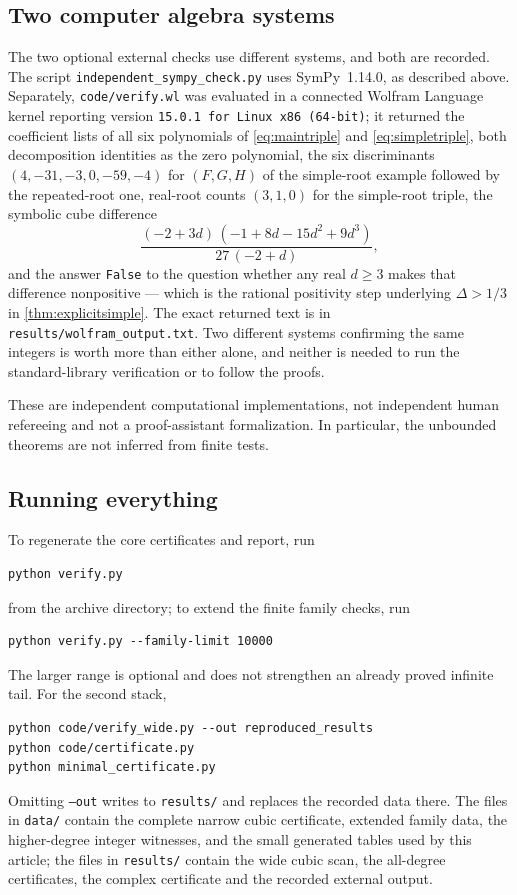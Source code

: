 \documentclass[11pt,letterpaper]{article}
\numberwithin{equation}{section}
\theoremstyle{definition}
\theoremstyle{remark}
\begin{document}
\subsection{Two computer algebra systems}

The two optional external checks use different systems, and both are
recorded. The script
\texttt{independent\_sympy\_check.py} uses SymPy~1.14.0, as described above.
Separately, \texttt{code/verify.wl} was evaluated in a connected Wolfram
Language kernel reporting version \texttt{15.0.1 for Linux x86 (64-bit)}; it
returned the coefficient lists of all six polynomials of
\eqref{eq:maintriple} and \eqref{eq:simpletriple}, both decomposition
identities as the zero polynomial, the six discriminants $(4,-31,-3,0,-59,-4)$
for $(F,G,H)$ of the simple-root example followed by the repeated-root one,
real-root counts $(3,1,0)$ for the simple-root triple, the symbolic
cube difference
\[
 \frac{(-2+3d)\,(-1+8d-15d^2+9d^3)}{27\,(-2+d)},
\]
and the answer \texttt{False} to the question whether any real $d\ge3$ makes
that difference nonpositive --- which is the rational positivity step
underlying $\Delta>1/3$ in \cref{thm:explicitsimple}. The exact returned text
is in \texttt{results/wolfram\_output.txt}. Two different systems confirming
the same integers is worth more than either alone, and neither is needed to
run the standard-library verification or to follow the proofs.

These are independent computational implementations, not independent human
refereeing and not a proof-assistant formalization. In particular, the
unbounded theorems are not inferred from finite tests.

\subsection{Running everything}

To regenerate the core certificates and report, run
\begin{lstlisting}[language={}]
python verify.py
\end{lstlisting}
from the archive directory; to extend the finite family checks, run
\begin{lstlisting}[language={}]
python verify.py --family-limit 10000
\end{lstlisting}
The larger range is optional and does not strengthen an already proved
infinite tail. For the second stack,
\begin{lstlisting}[language={}]
python code/verify_wide.py --out reproduced_results
python code/certificate.py
python minimal_certificate.py
\end{lstlisting}
Omitting \texttt{--out} writes to \texttt{results/} and replaces the recorded
data there. The files in \texttt{data/} contain the complete narrow cubic
certificate, extended family data, the higher-degree integer witnesses, and
the small generated tables used by this article; the files in
\texttt{results/} contain the wide cubic scan, the all-degree certificates,
the complex certificate and the recorded external output.
\end{document}
